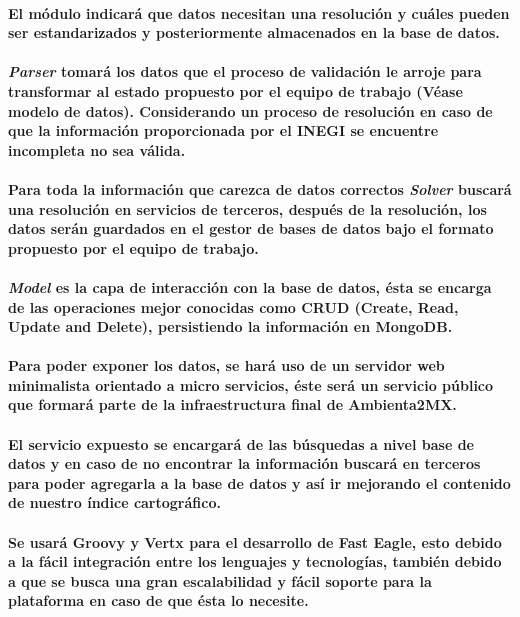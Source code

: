     \paragraph{El módulo indicará que datos necesitan una resolución y cuáles pueden ser estandarizados y posteriormente almacenados en la base de datos.}
    \paragraph{\textbf{\emph{Parser}} tomará los datos que el proceso de validación le arroje para transformar al estado propuesto por el equipo de trabajo (Véase modelo de datos). Considerando un proceso de resolución en caso de que la información proporcionada por el INEGI se encuentre incompleta no sea válida.}
    \paragraph{Para toda la información que carezca de datos correctos \textbf{\emph{Solver}} buscará una resolución en servicios de terceros, después de la resolución, los datos serán guardados en el gestor de bases de datos bajo el formato propuesto por el equipo de trabajo.}
    \paragraph{\textbf{\emph{Model}} es la capa de interacción con la base de datos, ésta se encarga de las operaciones mejor conocidas como CRUD (Create, Read, Update and Delete),  persistiendo la información en MongoDB.}
    \paragraph{Para poder exponer los datos, se hará uso de un servidor web minimalista orientado a micro servicios, éste será un servicio público que formará parte de la infraestructura final de Ambienta2MX.}
    \paragraph{El servicio expuesto se encargará de las búsquedas a nivel base de datos y en caso de no encontrar la información buscará en terceros para poder agregarla a la base de datos y así ir mejorando el contenido de nuestro índice cartográfico.}
    \paragraph{Se usará Groovy y Vertx para el desarrollo de Fast Eagle, esto debido a la fácil integración entre los lenguajes y tecnologías, también debido a que se busca una gran escalabilidad y fácil soporte para la plataforma en caso de que ésta lo necesite.}
